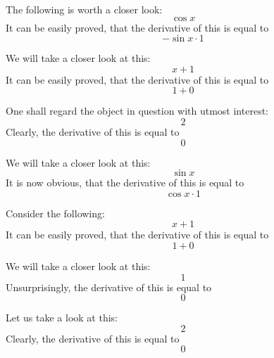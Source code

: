 \documentclass{article}
\begin{document}
The following is worth a closer look:
\begin{equation}
\cos x 
\end{equation}
It can be easily proved, that the derivative of this is equal to
\begin{equation}
-\sin x \cdot 1 
\end{equation}

We will take a closer look at this:
\begin{equation}
x + 1 
\end{equation}
It can be easily proved, that the derivative of this is equal to
\begin{equation}
1 + 0 
\end{equation}

One shall regard the object in question with utmost interest:
\begin{equation}
2 
\end{equation}
Clearly, the derivative of this is equal to
\begin{equation}
0 
\end{equation}

We will take a closer look at this:
\begin{equation}
\sin x 
\end{equation}
It is now obvious, that the derivative of this is equal to
\begin{equation}
\cos x \cdot 1 
\end{equation}

Consider the following:
\begin{equation}
x + 1 
\end{equation}
It can be easily proved, that the derivative of this is equal to
\begin{equation}
1 + 0 
\end{equation}

We will take a closer look at this:
\begin{equation}
1 
\end{equation}
Unsurprisingly, the derivative of this is equal to
\begin{equation}
0 
\end{equation}

Let us take a look at this:
\begin{equation}
2 
\end{equation}
Clearly, the derivative of this is equal to
\begin{equation}
0 
\end{equation}
\end{document}
